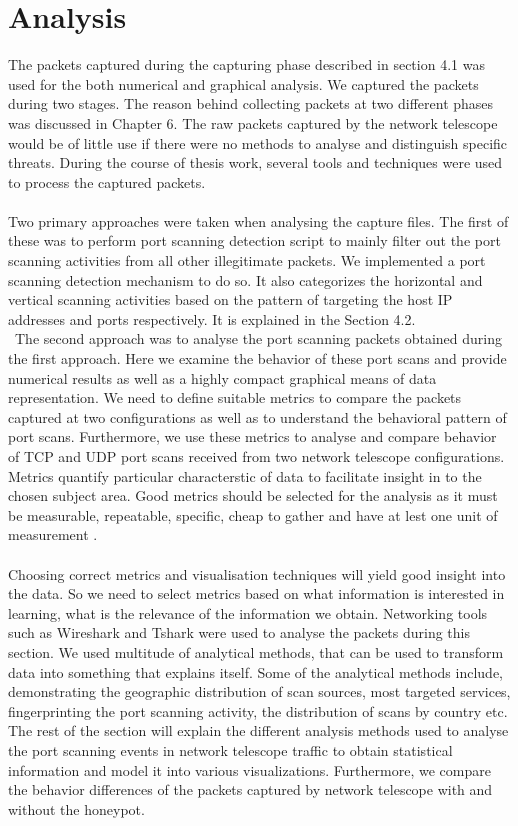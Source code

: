 \section{Analysis}
The packets captured during the capturing phase described in section 4.1 was used for the both numerical and graphical analysis.
We captured the packets during two stages.
The reason behind collecting packets at two different phases was discussed in Chapter 6. 
The raw packets captured by the network telescope would be of little use if there were no methods to analyse and distinguish specific threats.
During the course of thesis work, several tools and techniques were used to process the captured packets.\\\\
Two primary approaches were taken when analysing the capture files.
The first of these was to perform port scanning detection script  to mainly filter out the port scanning activities from all other illegitimate packets.
We implemented a port scanning detection mechanism to do so.
It also categorizes the horizontal and vertical scanning activities based on the pattern of targeting the host IP addresses and ports respectively.
It is explained in the Section 4.2.\\\
The second approach was to analyse the port scanning packets obtained during the first approach.
Here we examine the behavior of these port scans and provide numerical results as well as a highly compact graphical means of data representation.
We need to define suitable metrics to compare the packets captured at two configurations as well as to understand the behavioral pattern of port scans. 
Furthermore, we use these metrics to analyse and compare behavior of TCP and UDP port scans received from two network telescope configurations.
Metrics quantify particular characterstic of data to facilitate insight in to the chosen subject area.
Good metrics should be selected for the analysis as it must be measurable, repeatable, specific, cheap to gather and have at lest one unit of measurement \cite{jaquith2007security} \cite{hunter2010network}.\\\\
Choosing correct metrics and visualisation techniques will yield good insight into the data.
So we need to select metrics based on what information is interested in learning, what is the relevance of the information we obtain. 
Networking tools such as Wireshark and Tshark were used to analyse the packets during this section.
We used  multitude of analytical methods, that can be used to transform data into something that explains itself.
Some of the analytical methods include, demonstrating the geographic distribution of scan sources, most targeted services, fingerprinting the port scanning activity, the distribution of scans by country etc.
The rest of the section will explain the different analysis methods used to analyse the port scanning events in network telescope traffic  to obtain statistical information and model it into various visualizations.
Furthermore, we compare the behavior differences of the packets captured by network telescope with and without the honeypot. 
